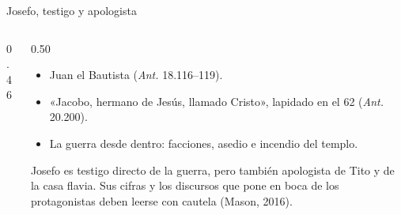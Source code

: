 \begin{frame}{Josefo, testigo y apologista}
\begin{columns}[T,onlytextwidth]
\begin{column}{0.46\textwidth}
\centering
{}
\end{column}
\begin{column}{0.50\textwidth}\footnotesize
{}
\begin{itemize}
\item Juan el Bautista (\emph{Ant.} 18.116--119).
\item «Jacobo, hermano de Jesús, llamado Cristo», lapidado en el 62 (\emph{Ant.} 20.200).
\item La guerra desde dentro: facciones, asedio e incendio del templo.
\end{itemize}
\vspace{4pt}
\begin{notalam}
Josefo es testigo directo de la guerra, pero también apologista de Tito y de la casa flavia. Sus cifras y los discursos que pone en boca de los protagonistas deben leerse con cautela (Mason, 2016).
\end{notalam}
\end{column}
\end{columns}
\end{frame}

